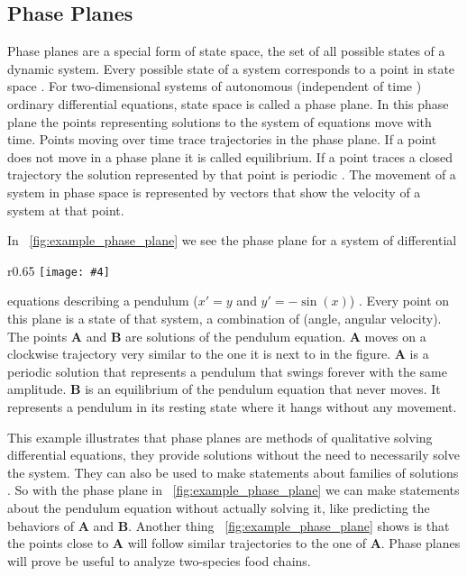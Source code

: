 \documentclass[12pt,a4paper,reqno]{amsart}
\newcommand{\figref}[1]{\textsc{\figurename}~\ref{#1}}
\newcommand{\makewrapfig}[5]{
\begin{wrapfigure}{#1}{#2}
    \captionsetup{margin=10pt,justification=centering}
    \texttt{[image: \#4]}
    \caption{#5}
    \label{fig:#4}
\end{wrapfigure}
}
\begin{document}
\subsection{Phase Planes}\label{sec:phase_plane}
Phase planes are a special form of state space, the set of all possible states
of a dynamic system. Every possible state of a system corresponds to a point in
state space \cite{terman}. For two-dimensional systems of autonomous 
(independent of time \cite{kreyszig}) ordinary differential equations, state
space is called a phase plane. In this phase plane the points representing
solutions to the system of equations move with time. Points moving over time
trace trajectories in the phase plane. If a point does not move in a phase
plane it is called equilibrium. If a point traces a closed trajectory the
solution represented by that point is periodic \cite{terman}. The movement of
a system in phase space is represented by vectors that show the velocity of
a system at that point.

In \figref{fig:example_phase_plane} we see the phase plane for a system of
differential
\makewrapfig{r}{0.65\textwidth}{0.65\textwidth}{example_phase_plane}{Phase
plane of a pendulum with contour lines} equations describing a pendulum
($x'=y$ and $y'=-\sin(x)$) \cite{terman}. Every point on this plane is a state
of that system, a combination of (angle, angular velocity). The points
\textbf{A} and \textbf{B} are solutions of the pendulum equation. \textbf{A}
moves on a clockwise trajectory very similar to the one it is next to in the
figure. \textbf{A} is a periodic solution that represents a pendulum that
swings forever with the same amplitude. \textbf{B} is an equilibrium of the
pendulum equation that never moves. It represents a pendulum in its resting
state where it hangs without any movement.

This example illustrates that phase planes are methods of qualitative solving
differential equations, they provide solutions without the need to necessarily
solve the system. They can also be used to make statements about families of
solutions \cite{kreyszig}. So with the phase plane in
\figref{fig:example_phase_plane} we can make statements about the pendulum
equation without actually solving it, like predicting the behaviors of
\textbf{A} and \textbf{B}. Another thing \figref{fig:example_phase_plane} shows
is that the points close to \textbf{A} will follow similar trajectories to the
one of \textbf{A}. Phase planes will prove be useful to analyze two-species
food chains.
\end{document}
